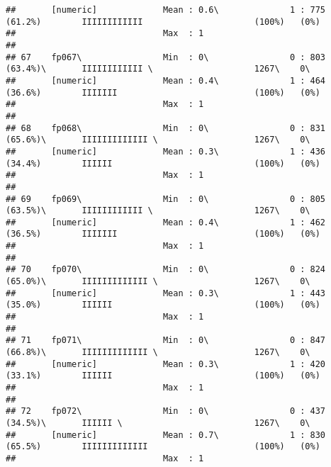 \documentclass[]{article}
\begin{document}
\begin{verbatim}
##       [numeric]             Mean : 0.6\              1 : 775 (61.2%)        IIIIIIIIIIII                      (100%)   (0%)     
##                             Max  : 1                                                                                            
## 
## 67    fp067\                Min  : 0\                0 : 803 (63.4%)\       IIIIIIIIIIII \                    1267\    0\       
##       [numeric]             Mean : 0.4\              1 : 464 (36.6%)        IIIIIII                           (100%)   (0%)     
##                             Max  : 1                                                                                            
## 
## 68    fp068\                Min  : 0\                0 : 831 (65.6%)\       IIIIIIIIIIIII \                   1267\    0\       
##       [numeric]             Mean : 0.3\              1 : 436 (34.4%)        IIIIII                            (100%)   (0%)     
##                             Max  : 1                                                                                            
## 
## 69    fp069\                Min  : 0\                0 : 805 (63.5%)\       IIIIIIIIIIII \                    1267\    0\       
##       [numeric]             Mean : 0.4\              1 : 462 (36.5%)        IIIIIII                           (100%)   (0%)     
##                             Max  : 1                                                                                            
## 
## 70    fp070\                Min  : 0\                0 : 824 (65.0%)\       IIIIIIIIIIIII \                   1267\    0\       
##       [numeric]             Mean : 0.3\              1 : 443 (35.0%)        IIIIII                            (100%)   (0%)     
##                             Max  : 1                                                                                            
## 
## 71    fp071\                Min  : 0\                0 : 847 (66.8%)\       IIIIIIIIIIIII \                   1267\    0\       
##       [numeric]             Mean : 0.3\              1 : 420 (33.1%)        IIIIII                            (100%)   (0%)     
##                             Max  : 1                                                                                            
## 
## 72    fp072\                Min  : 0\                0 : 437 (34.5%)\       IIIIII \                          1267\    0\       
##       [numeric]             Mean : 0.7\              1 : 830 (65.5%)        IIIIIIIIIIIII                     (100%)   (0%)     
##                             Max  : 1                                                                                            

\end{verbatim}
\end{document}
